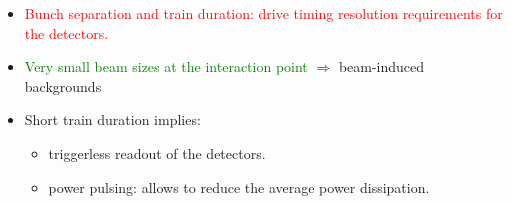 \begin{frame}



\begin{itemize}
\item \textcolor{Red}{Bunch separation and train duration: drive
    timing resolution requirements for the detectors.}
\item \textcolor{Green}{Very small beam sizes at the interaction
    point} $\Rightarrow$ beam-induced backgrounds
\end{itemize}



\begin{itemize}
\item Short train duration implies:
  \begin{itemize}
  \item triggerless readout of the detectors.
  \item power pulsing: allows to reduce the average power dissipation.
  \end{itemize}
\end{itemize}

\end{frame}


